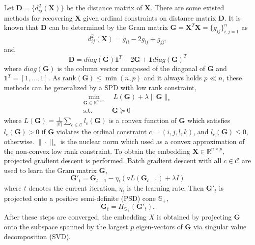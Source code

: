 \documentclass[letterpaper]{article}
\begin{document}
		Let $\mathbf{D}=\{d^2_{ij}(\mathbf{X})\}$ be the distance matrix of $\mathbf{X}$. There are some existed methods for recovering $\mathbf{X}$ given ordinal constraints on distance matrix $\mathbf{D}$. It is known that $\mathbf{D}$ can be determined by the Gram matrix $\mathbf{G} = \mathbf{X}^T\mathbf{X} = \{g_{ij}\}^{n}_{i,j=1}$ as
		$$
		d^2_{ij}(\mathbf{X}) = g_{ii}-2g_{ij}+g_{jj},
		$$
		and
		$$
		\mathbf{D} = diag(\mathbf{G})\mathbf{1}^T-2\mathbf{G}+\mathbf{1}diag(\mathbf{G})^T
		$$
		where $diag(\mathbf{G})$ is the column vector composed of the diagonal of $\mathbf{G}$ and $\mathbf{1}^T=[1,\dots,1]$. As $\text{rank}(\mathbf{G})\leq\min(n, p)$ and it always holds $p\ll n$, these methods\cite{agarwal2007generalized,tamuz2011adaptiive,vandermaaten2012stochastic} can be generalized by a SPD with low rank constraint,
		\begin{equation}
		\label{eq:1}
			\begin{aligned}
				\underset{\mathbf{G}\in\mathbb{R}^{n\times n}}{\min}&\ \ L(\mathbf{G})+\lambda\|\mathbf{G}\|_{*}\\
				\text{s.t.}&\ \mathbf{G}\succeq 0
			\end{aligned}
		\end{equation}
		where $L(\mathbf{G})=\frac{1}{|\mathcal{C}|}\sum_{c\in\mathcal{C}}l_c(\mathbf{G})$ is a convex function of $\mathbf{G}$ which satisfies $l_c(\mathbf{G})> 0$ if $\mathbf{G}$ violates the ordinal constraint $c=(i,j,l,k)$, and $l_c(\mathbf{G})\leq 0$, otherwise. $\|\cdot\|_{*}$ is the nuclear norm which used as a convex approximation of the non-convex low rank constraint. To obtain the embedding $\mathbf{X}\in\mathbb{R}^{n\times p}$, projected gradient descent is performed. Batch gradient descent with all $c\in\mathcal{C}$ are used to learn the Gram matrix $\mathbf{G}$,
		$$
		{\mathbf{G}}'_{t} = \mathbf{G}_{t-1}-\eta_{t}(\triangledown L(\mathbf{G}_{t-1})+\lambda I)
		$$
		where $t$ denotes the current iteration, $\eta_t$ is the learning rate. Then ${\mathbf{G}}'_{t}$ is projected onto a positive semi-definite (PSD) cone $\mathbb{S}_+$,
		$$
		\mathbf{G}_{t} = \Pi_{\mathbb{S}_+}({\mathbf{G}}'_{t}).
		$$
		After these steps are converged, the embedding $X$ is obtained by projecting $\mathbf{G}$ onto the subspace spanned by the largest $p$ eigen-vectors of $\mathbf{G}$ via singular value decomposition (SVD).
\end{document}
